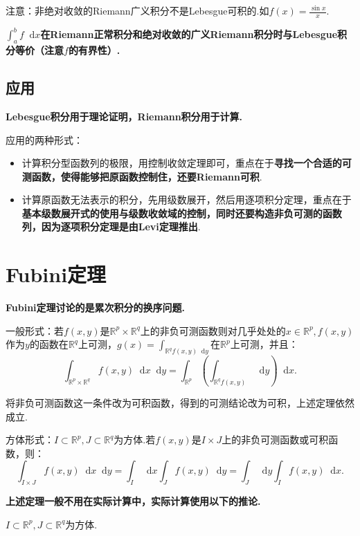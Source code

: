 \documentclass[bwprint, withoutpreface]{cumcmthesis}
\newcommand*{\dif}{\mathop{}\!\mathrm{d}}
\begin{document}
注意：非绝对收敛的Riemann广义积分不是Lebesgue可积的.如$f(x) = \frac{\sin{x}}{x}$.

$\int_{a}^{b} f \dif x$\textbf{在Riemann正常积分和绝对收敛的广义Riemann积分时与Lebesgue积分等价（注意$f$的有界性）.}

\subsection{应用}
\textbf{Lebesgue积分用于理论证明，Riemann积分用于计算.}

应用的两种形式：
\begin{itemize}[itemindent=2em]
	\item 计算积分型函数列的极限，用控制收敛定理即可，重点在于\textbf{寻找一个合适的可测函数，使得能够把原函数控制住，还要Riemann可积}.
	\item 计算原函数无法表示的积分，先用级数展开，然后用逐项积分定理，重点在于\textbf{基本级数展开式的使用与级数收敛域的控制，同时还要构造非负可测的函数列，因为逐项积分定理是由Levi定理推出}.
\end{itemize}

\section{Fubini定理}

\textbf{Fubini定理讨论的是累次积分的换序问题.}

一般形式：若$f(x, y)$是$\mathbb{R}^p \times \mathbb{R}^q$上的非负可测函数则对几乎处处的$x \in \mathbb{R}^p, f(x, y)$作为$y$的函数在$\mathbb{R}^q$上可测，$g(x) = \int_{\mathbb{R}^q f(x, y) \dif y}$在$\mathbb{R}^p$上可测，并且：
\begin{equation*}
	\int_{\mathbb{R}^p \times \mathbb{R}^q} f(x, y) \dif x \dif y = \int_{\mathbb{R}^p}(\int_{\mathbb{R}^q f(x, y)} \dif y) \dif x.
\end{equation*}

将非负可测函数这一条件改为可积函数，得到的可测结论改为可积，上述定理依然成立.

方体形式：$I \subset \mathbb{R}^p, J \subset \mathbb{R}^q$为方体.若$f(x, y)$是$I \times J$上的非负可测函数或可积函数，则：
\begin{equation*}
	\int_{I \times J} f(x, y) \dif x \dif y = \int_I \dif x \int_J f(x, y) \dif y = \int_J \dif y \int_I f(x, y) \dif x. 
\end{equation*}

\textbf{上述定理一般不用在实际计算中，实际计算使用以下的推论.}

$I \subset \mathbb{R}^p, J \subset \mathbb{R}^q$为方体.
\end{document}
